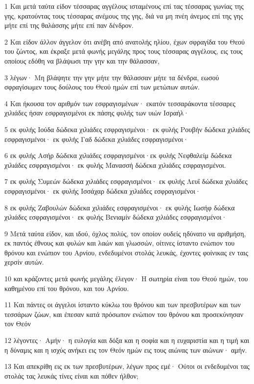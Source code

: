 \par 1 Και μετά ταύτα είδον τέσσαρας αγγέλους ισταμένους επί τας τέσσαρας γωνίας της γης, κρατούντας τους τέσσαρας ανέμους της γης, διά να μη πνέη άνεμος επί της γης μήτε επί της θαλάσσης μήτε επί παν δένδρον.
\par 2 Και είδον άλλον άγγελον ότι ανέβη από ανατολής ηλίου, έχων σφραγίδα του Θεού του ζώντος, και έκραξε μετά φωνής μεγάλης προς τους τέσσαρας αγγέλους, εις τους οποίους εδόθη να βλάψωσι την γην και την θάλασσαν,
\par 3 λέγων· Μη βλάψητε την γην μήτε την θάλασσαν μήτε τα δένδρα, εωσού σφραγίσωμεν τους δούλους του Θεού ημών επί των μετώπων αυτών.
\par 4 Και ήκουσα τον αριθμόν των εσφραγισμένων· εκατόν τεσσαράκοντα τέσσαρες χιλιάδες ήσαν εσφραγισμένοι εκ πάσης φυλής των υιών Ισραήλ·
\par 5 εκ φυλής Ιούδα δώδεκα χιλιάδες εσφραγισμένοι· εκ φυλής Ρουβήν δώδεκα χιλιάδες εσφραγισμένοι· εκ φυλής Γαδ δώδεκα χιλιάδες εσφραγισμένοι·
\par 6 εκ φυλής Ασήρ δώδεκα χιλιάδες εσφραγισμένοι·εκ φυλής Νεφθαλείμ δώδεκα χιλιάδες εσφραγισμένοι· εκ φυλής Μανασσή δώδεκα χιλιάδες εσφραγισμένοι.
\par 7 εκ φυλής Συμεών δώδεκα χιλιάδες εσφραγισμένοι· εκ φυλής Λευΐ δώδεκα χιλιάδες εσφραγισμένοι· εκ φυλής Ισσάχαρ δώδεκα χιλιάδες εσφραγισμένοι·
\par 8 εκ φυλής Ζαβουλών δώδεκα χιλιάδες εσφραγισμένοι· εκ φυλής Ιωσήφ δώδεκα χιλιάδες εσφραγισμένοι· εκ φυλής Βενιαμίν δώδεκα χιλιάδες εσφραγισμένοι·
\par 9 Μετά ταύτα είδον, και ιδού, όχλος πολύς, τον οποίον ουδείς ηδύνατο να αριθμήση, εκ παντός έθνους και φυλών και λαών και γλωσσών, οίτινες ίσταντο ενώπιον του θρόνου και ενώπιον του Αρνίου, ενδεδυμένοι στολάς λευκάς, έχοντες φοίνικας εν ταις χερσίν αυτών.
\par 10 και κράζοντες μετά φωνής μεγάλης έλεγον· Η σωτηρία είναι του Θεού ημών, του καθημένου επί του θρόνου, και του Αρνίου.
\par 11 Και πάντες οι άγγελοι ίσταντο κύκλω του θρόνου και των πρεσβυτέρων και των τεσσάρων ζώων, και έπεσαν κατά πρόσωπον ενώπιον του θρόνου και προσεκύνησαν τον Θεόν
\par 12 λέγοντες· Αμήν· η ευλογία και δόξα και η σοφία και η ευχαριστία και η τιμή και η δύναμις και η ισχύς ανήκει εις τον Θεόν ημών εις τους αιώνας των αιώνων· αμήν.
\par 13 Και απεκρίθη εις εκ των πρεσβυτέρων, λέγων προς εμέ· Ούτοι οι ενδεδυμένοι τας στολάς τας λευκάς τίνες είναι και πόθεν ήλθον;
